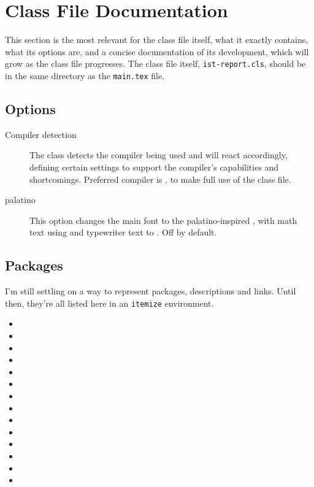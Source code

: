 \section{Class File Documentation}

This section is the most relevant for the class file itself, what it exactly contains, what its options are, and a concise documentation of its development, which will grow as the class file progresses. The class file itself, \texttt{ist-report.cls}, should be in the same directory as the \texttt{main.tex} file.

\subsection{Options}

\begin{description}
	\item[Compiler detection] The class detects the compiler being used and will react accordingly, defining certain settings to support the compiler's capabilities and shortcomings. Preferred compiler is \XeLaTeX{}, to make full use of the class file\footnotemark{}. 
	\item[palatino] This option changes the main font to the palatino-inspired , with math text using  and typewriter text to . Off by default.
\end{description}

\subsection{Packages}

I'm still settling on a way to represent packages, descriptions and links. Until then, they're all listed here in an \texttt{itemize} environment.
\begin{itemize}
	\item {}
	\item {}
	\item {}
	\item {}
	\item {}
	\item {}
	\item {}
	\item {}
	\item {}
	\item {}
	\item {}
	\item {}
	\item {}
	\item {}
\end{itemize}

